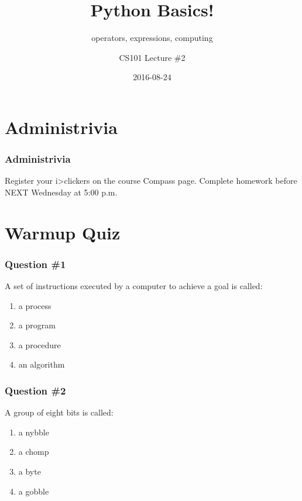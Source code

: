 \documentclass[11pt]{beamer}
\title{Python Basics!}
\subtitle{operators, expressions, computing}
\author{CS101 Lecture \#2}
\date{2016-08-24}
\begin{document}
  \setcounter{showProgressBar}{0}
  \setcounter{showSlideNumbers}{0}

\frame{\titlepage}

\setcounter{framenumber}{0}
\setcounter{showProgressBar}{1}
\setcounter{showSlideNumbers}{1}

\section{Administrivia}

\begin{frame}
  \frametitle{Administrivia}
  \Enlarge
  \begin{itemize}
  \myitem  Register your i>clickers on the course Compass page.
  \myitem  Complete homework before NEXT Wednesday at 5:00 p.m.
  \end{itemize}
\end{frame}

\section{Warmup Quiz}

\begin{frame}
  \frametitle{Question \#1}
  \Enlarge

  A set of instructions executed by a computer to achieve a goal is called:
  \begin{enumerate}[label=\Alph*]
  \item  a process
  \item  a program
  \item  a procedure
  \item  an algorithm
  \end{enumerate}
\end{frame}

\begin{frame}
  \frametitle{Question \#2}
  \Enlarge

  A group of eight bits is called:
  \begin{enumerate}[label=\Alph*]
  \item  a nybble
  \item  a chomp
  \item  a byte
  \item  a gobble
  \end{enumerate}
\end{frame}
\end{document}
